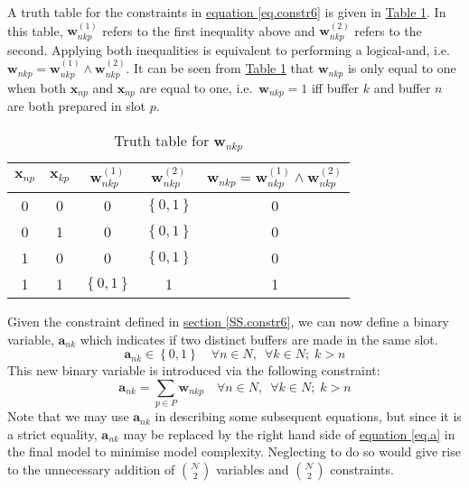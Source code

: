 A truth table for the constraints in 
\hyperref[eq.constr6]{equation \ref*{eq.constr6}} is given in
\hyperref[tbl.truthw]{Table \ref*{tbl.truthw}}.
In this table, $\boldsymbol{w}_{nkp}^{\left( 1 \right)}$ refers to the first
inequality above and $\boldsymbol{w}_{nkp}^{\left( 2 \right)}$ refers to the
second.
Applying both inequalities is equivalent to performing a logical-and, i.e.\
$\boldsymbol{w}_{nkp} = \boldsymbol{w}_{nkp}^{\left( 1 \right)} \land
\boldsymbol{w}_{nkp}^{\left( 2 \right)}$.
It can be seen from \hyperref[tbl.truthw]{Table \ref*{tbl.truthw}} that 
$\boldsymbol{w}_{nkp}$ is only equal to one when both $\boldsymbol{x}_{np}$ and
$\boldsymbol{x}_{np}$ are equal to one, i.e.\ $\boldsymbol{w}_{nkp} = 1$ iff
buffer $k$ and buffer $n$ are both prepared in slot $p$.
\begin{table}[h!]
    \centering
    \caption{Truth table for $\boldsymbol{w}_{nkp}$}
    \label{tbl.truthw}
    \begin{tabular}{c c | c c | c}
        $\boldsymbol{x}_{np}$ & $\boldsymbol{x}_{kp}$ &
        $\boldsymbol{w}_{nkp}^{\left( 1 \right)}$ &
        $\boldsymbol{w}_{nkp}^{\left( 2 \right)}$ &
        $\boldsymbol{w}_{nkp} = \boldsymbol{w}_{nkp}^{\left( 1 \right)}
            \land \boldsymbol{w}_{nkp}^{\left( 2 \right)}
        $\\ \hline
        0 & 0 & 0 & $\left\{ 0,1 \right\}$ & 0\\
        0 & 1 & 0 & $\left\{ 0,1 \right\}$ & 0\\
        1 & 0 & 0 & $\left\{ 0,1 \right\}$ & 0\\
        1 & 1 & $\left\{ 0,1 \right\}$ & 1 & 1\\
    \end{tabular}
\end{table}

Given the constraint defined in
\hyperref[SS.constr6]{section \ref*{SS.constr6}}, we can now define a binary
variable, $\boldsymbol{a}_{nk}$ which indicates if two distinct buffers are
made in the same slot.
\begin{equation}
    \boldsymbol{a}_{nk} \in \left\{ 0, 1 \right\} \quad \forall n \in N,
    \enspace \forall k \in N; \; k > n
    \label{eq.a}
\end{equation}
This new binary variable is introduced via the following constraint:
\begin{equation}
    \boldsymbol{a}_{nk} = \sum_{p \in P} \boldsymbol{w}_{nkp} \quad
    \forall n \in N, \enspace \forall k \in N; \; k > n
    \label{eq.a}
\end{equation}
Note that we may use $\boldsymbol{a}_{nk}$ in describing some subsequent
equations, but since it is a strict equality, $\boldsymbol{a}_{nk}$ may be 
replaced by the right hand side of \hyperref[eq.a]{equation \ref*{eq.a}} in the
final model to minimise model complexity.
Neglecting to do so would give rise to the unnecessary addition of
$\binom{\mathcal{N}}{2}$ variables and $\binom{\mathcal{N}}{2}$ constraints.

